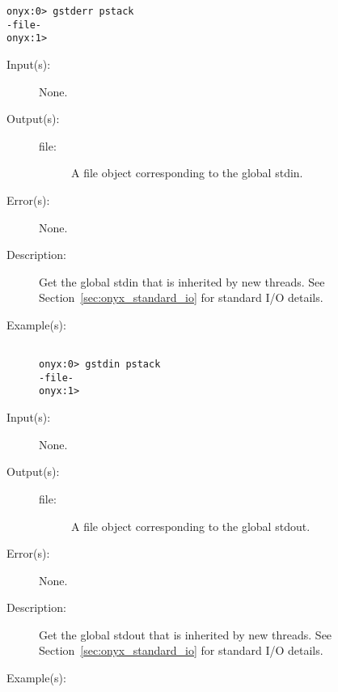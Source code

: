 \begin{description}
\begin{description}
\begin{verbatim}
onyx:0> gstderr pstack
-file-
onyx:1>
		\end{verbatim}
	\end{description}
\label{systemdict:gstdin}
\item[{\onyxop{--}{gstdin}{file}}: ]
	\begin{description}\item[]
	\item[Input(s): ] None.
	\item[Output(s): ]
		\begin{description}\item[]
		\item[file: ]
			A file object corresponding to the global stdin.
		\end{description}
	\item[Error(s): ] None.
	\item[Description: ]
		Get the global stdin that is inherited by new threads.  See
		Section~\ref{sec:onyx_standard_io} for standard I/O details.
	\item[Example(s): ]\begin{verbatim}

onyx:0> gstdin pstack
-file-
onyx:1>
		\end{verbatim}
	\end{description}
\label{systemdict:gstdout}
\item[{\onyxop{--}{gstdout}{file}}: ]
	\begin{description}\item[]
	\item[Input(s): ] None.
	\item[Output(s): ]
		\begin{description}\item[]
		\item[file: ]
			A file object corresponding to the global stdout.
		\end{description}
	\item[Error(s): ] None.
	\item[Description: ]
		Get the global stdout that is inherited by new threads.  See
		Section~\ref{sec:onyx_standard_io} for standard I/O details.
	\item[Example(s): ]\begin{verbatim}


\end{verbatim}
\end{description}
\end{description}
